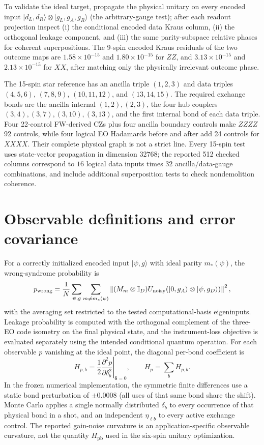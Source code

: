 \documentclass[aps,prx,onecolumn,10pt]{revtex4-2}
\newcommand{\id}{\mathbb I}
\newcommand{\Hpb}{H_{\mathrm{pb}}}
\begin{document}
To validate the ideal target, propagate the physical unitary on every encoded input $|d_L,d_R\rangle\otimes|g_L,g_A,g_R\rangle$ (the arbitrary-gauge test); after each readout projection inspect (i) the conditional encoded data Kraus column, (ii) the orthogonal leakage component, and (iii) the same parity-subspace relative phases for coherent superpositions. The 9-spin encoded Kraus residuals of the two outcome maps are $1.58\times10^{-15}$ and $1.80\times10^{-15}$ for $ZZ$, and $3.13\times10^{-15}$ and $2.13\times10^{-15}$ for $XX$, after matching only the physically irrelevant outcome phase.

The 15-spin star reference has an ancilla triple $(1,2,3)$ and data triples $(4,5,6)$, $(7,8,9)$, $(10,11,12)$, and $(13,14,15)$. The required exchange bonds are the ancilla internal $(1,2),(2,3)$, the four hub couplers $(3,4),(3,7),(3,10),(3,13)$, and the first internal bond of each data triple. Four 22-control FW-derived CZs plus four ancilla boundary controls make $ZZZZ$ 92 controls, while four logical EO Hadamards before and after add 24 controls for $XXXX$. Their complete physical graph is not a strict line. Every 15-spin test uses state-vector propagation in dimension $32768$; the reported 512 checked columns correspond to $16$ logical data inputs times $32$ ancilla/data-gauge combinations, and include additional superposition tests to check nondemolition coherence.

\section{Observable definitions and error covariance}
For a correctly initialized encoded input $|\psi,g\rangle$ with ideal parity $m_*(\psi)$, the wrong-syndrome probability is
\begin{equation}
 p_{\rm wrong}=\frac{1}{N}\sum_{\psi,g}\sum_{m\neq m_*(\psi)} \left\|(M_m\otimes\id_D) U_{\rm noisy}(|0,g_A\rangle\otimes|\psi,g_D\rangle)\right\|^2,
\end{equation}
with the averaging set restricted to the tested computational-basis eigeninputs. Leakage probability is computed with the orthogonal complement of the three-EO code isometry on the final physical state, and the instrument-loss objective is evaluated separately using the intended conditional quantum operation. For each observable $p$ vanishing at the ideal point, the diagonal per-bond coefficient is
\begin{equation}
 H_{p,b}=\frac12\left.\frac{\partial^2p}{\partial\delta_b^2}\right|_{\bm\delta=0},\qquad H_p=\sum_bH_{p,b}.
\end{equation}
In the frozen numerical implementation, the symmetric finite differences use a static bond perturbation of $\pm0.0008$ (all uses of that same bond share the shift). Monte Carlo applies a single normally distributed $\delta_b$ to every occurrence of that physical bond in a shot, and an independent $\eta_{\ell b}$ to every active exchange control. The reported gain-noise curvature is an application-specific observable curvature, not the quantity $\Hpb$ used in the six-spin unitary optimization.
\end{document}
